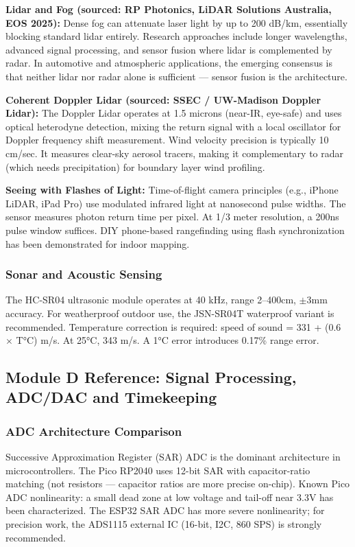 \documentclass[11pt,letterpaper]{article}
\begin{document}
\textbf{Lidar and Fog (sourced: RP Photonics, LiDAR Solutions Australia, EOS 2025):} Dense fog can attenuate laser light by up to 200 dB/km, essentially blocking standard lidar entirely. Research approaches include longer wavelengths, advanced signal processing, and sensor fusion where lidar is complemented by radar. In automotive and atmospheric applications, the emerging consensus is that neither lidar nor radar alone is sufficient --- sensor fusion is the architecture.

\textbf{Coherent Doppler Lidar (sourced: SSEC / UW-Madison Doppler Lidar):} The Doppler Lidar operates at 1.5 microns (near-IR, eye-safe) and uses optical heterodyne detection, mixing the return signal with a local oscillator for Doppler frequency shift measurement. Wind velocity precision is typically 10 cm/sec. It measures clear-sky aerosol tracers, making it complementary to radar (which needs precipitation) for boundary layer wind profiling.

\textbf{Seeing with Flashes of Light:} Time-of-flight camera principles (e.g., iPhone LiDAR, iPad Pro) use modulated infrared light at nanosecond pulse widths. The sensor measures photon return time per pixel. At 1/3 meter resolution, a 200ns pulse window suffices. DIY phone-based rangefinding using flash synchronization has been demonstrated for indoor mapping.

\subsubsection{Sonar and Acoustic Sensing}

The HC-SR04 ultrasonic module operates at 40 kHz, range 2--400cm, $\pm$3mm accuracy. For weatherproof outdoor use, the JSN-SR04T waterproof variant is recommended. Temperature correction is required: speed of sound = 331 + (0.6 $\times$ T°C) m/s. At 25°C, 343 m/s. A 1°C error introduces 0.17\% range error.

\subsection{Module D Reference: Signal Processing, ADC/DAC and Timekeeping}

\subsubsection{ADC Architecture Comparison}

Successive Approximation Register (SAR) ADC is the dominant architecture in microcontrollers. The Pico RP2040 uses 12-bit SAR with capacitor-ratio matching (not resistors --- capacitor ratios are more precise on-chip). Known Pico ADC nonlinearity: a small dead zone at low voltage and tail-off near 3.3V has been characterized. The ESP32 SAR ADC has more severe nonlinearity; for precision work, the ADS1115 external IC (16-bit, I2C, 860 SPS) is strongly recommended.
\end{document}

